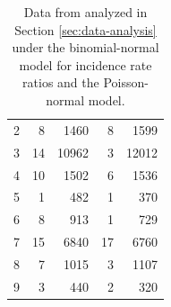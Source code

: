 \documentclass[12pt]{article}
\begin{document}
\begin{table}[htbp]
\begin{minipage}[t]{0.48\textwidth}
\begin{tabular}{rrrrr}
      2 & 8  & 1460  & 8  & 1599  \\
      3 & 14 & 10962 & 3  & 12012 \\
      4 & 10 & 1502  & 6  & 1536  \\
      5 & 1  & 482   & 1  & 370   \\
      6 & 8  & 913   & 1  & 729   \\
      7 & 15 & 6840  & 17 & 6760  \\
      8 & 7  & 1015  & 3  & 1107  \\
      9 & 3  & 440   & 2  & 320   \\
      \bottomrule
    \end{tabular}
\caption{Data from \citet{niel:08} analyzed in Section \ref{sec:data-analysis} under the binomial-normal model for incidence rate ratios and the Poisson-normal model.}
\label{tab:niel-weise-08}
  \end{minipage}
\end{table}
\end{document}
